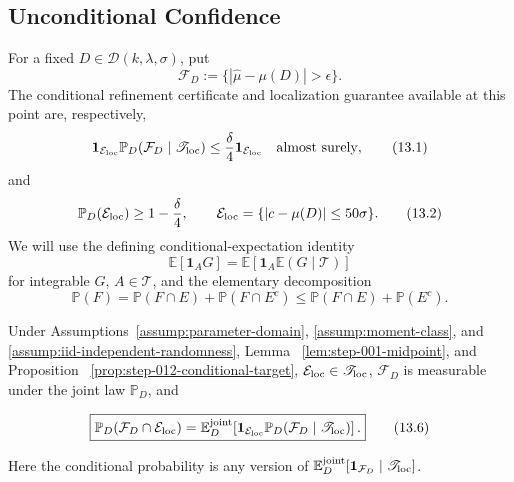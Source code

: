 \subsection{Unconditional Confidence}\label{app:step-013}

For a fixed \(D\in\mathcal D(k,\lambda,\sigma)\), put
\[
\mathcal F_D:=\{|\widehat\mu-\mu(D)|>\epsilon\}.
\tag{13.5}
\]
The conditional refinement certificate and localization guarantee available
at this point are, respectively,
\[
\mathbf1_{\mathcal E_{\rm loc}}
\mathbb P_D\!\left(\mathcal F_D\mid\mathscr T_{\rm loc}\right)
\leq\frac\delta4\mathbf1_{\mathcal E_{\rm loc}}
\quad\text{almost surely},
\tag{13.1}
\]
and
\[
\mathbb P_D(\mathcal E_{\rm loc})\geq1-\frac\delta4,
\qquad
\mathcal E_{\rm loc}=\{|c-\mu(D)|\leq50\sigma\}.
\tag{13.2}
\]
We will use the defining conditional-expectation identity
\[
\mathbb E[\mathbf1_A G]
=\mathbb E[\mathbf1_A\mathbb E(G\mid\mathscr T)]
\tag{13.3}
\]
for integrable \(G\), \(A\in\mathscr T\), and the elementary decomposition
\[
\mathbb P(F)
=\mathbb P(F\cap E)+\mathbb P(F\cap E^c)
\leq\mathbb P(F\cap E)+\mathbb P(E^c).
\tag{13.4}
\]

\begin{lemma}\label{lem:step-013-measurable-tower}
Under Assumptions~\ref{assump:parameter-domain},
\ref{assump:moment-class}, and
\ref{assump:iid-independent-randomness}, Lemma~
\ref{lem:step-001-midpoint}, and Proposition~
\ref{prop:step-012-conditional-target},
\(\mathcal E_{\rm loc}\in\mathscr T_{\rm loc}\),
\(\mathcal F_D\) is measurable under the joint law \(\mathbb P_D\), and

\[
\boxed{
\mathbb P_D(\mathcal F_D\cap\mathcal E_{\rm loc})
=\mathbb E_D^{\rm joint}\!\left[
 \mathbf1_{\mathcal E_{\rm loc}}
 \mathbb P_D(\mathcal F_D\mid\mathscr T_{\rm loc})
\right].
}
\tag{13.6}
\]

Here the conditional probability is any version of
\(\mathbb E_D^{\rm joint}[\mathbf1_{\mathcal F_D}
\mid\mathscr T_{\rm loc}]\).
\end{lemma}

